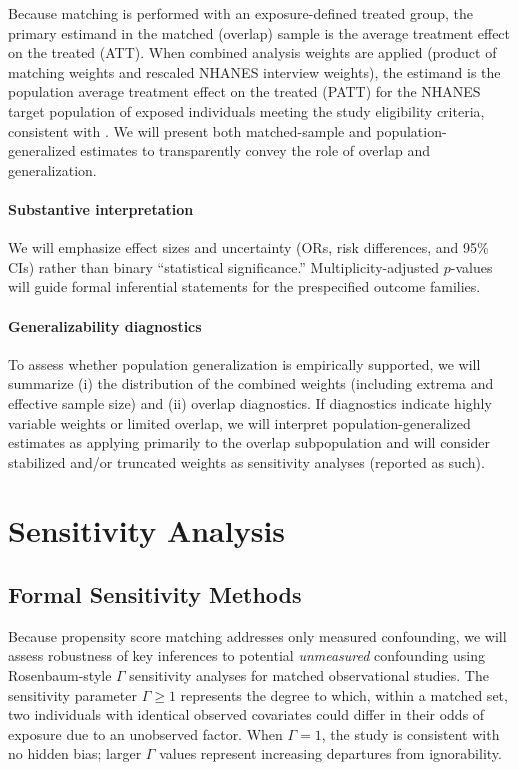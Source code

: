 \documentclass{article}
\begin{document}
Because matching is performed with an exposure-defined treated group, the primary estimand in the matched (overlap) sample is the average treatment effect on the treated (ATT). When combined analysis weights are applied (product of matching weights and rescaled NHANES interview weights), the estimand is the population average treatment effect on the treated (PATT) for the NHANES target population of exposed individuals meeting the study eligibility criteria, consistent with \citet{dugoff2014}. We will present both matched-sample and population-generalized estimates to transparently convey the role of overlap and generalization.

\paragraph{Substantive interpretation}

We will emphasize effect sizes and uncertainty (ORs, risk differences, and 95\% CIs) rather than binary ``statistical significance.'' Multiplicity-adjusted $p$-values will guide formal inferential statements for the prespecified outcome families.

\paragraph{Generalizability diagnostics}

To assess whether population generalization is empirically supported, we will summarize (i) the distribution of the combined weights (including extrema and effective sample size) and (ii) overlap diagnostics. If diagnostics indicate highly variable weights or limited overlap, we will interpret population-generalized estimates as applying primarily to the overlap subpopulation and will consider stabilized and/or truncated weights as sensitivity analyses (reported as such).

\section{Sensitivity Analysis}

\subsection{Formal Sensitivity Methods}

Because propensity score matching addresses only measured confounding, we will assess robustness of key inferences to potential \emph{unmeasured} confounding using Rosenbaum-style $\Gamma$ sensitivity analyses for matched observational studies. The sensitivity parameter $\Gamma \ge 1$ represents the degree to which, within a matched set, two individuals with identical observed covariates could differ in their odds of exposure due to an unobserved factor. When $\Gamma=1$, the study is consistent with no hidden bias; larger $\Gamma$ values represent increasing departures from ignorability.
\end{document}

